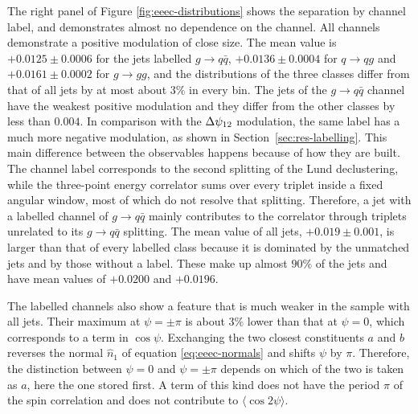 The right panel of Figure \ref{fig:eeec-distributions} shows the separation by channel label,
and demonstrates almost no dependence on the channel. All channels demonstrate a positive 
modulation of close size. The mean value is $+0.0125 \pm 0.0006$ for the
jets labelled $g \to q\bar{q}$, $+0.0136 \pm 0.0004$ for $q \to qg$ and
$+0.0161 \pm 0.0002$ for $g \to gg$, and the distributions of the three classes
differ from that of all jets by at most about $3\%$ in every bin. The jets of
the $g \to q\bar{q}$ channel have the weakest positive modulation and 
they differ from the other classes by less than $0.004$. In comparison with the
$\Delta\psi_{12}$ modulation, the same label has a much more negative modulation, as shown in Section~\ref{sec:res-labelling}.
This main difference between the observables happens because of how they are built. The channel
label corresponds to the second splitting of the Lund declustering, while the three-point energy
correlator sums over every triplet inside a fixed angular window, most of which do not
resolve that splitting. Therefore, a jet with a labelled channel of $g \to q\bar{q}$
mainly contributes to the correlator through triplets unrelated to its $g \to q\bar{q}$ splitting.
The mean value of all jets, $+0.019 \pm 0.001$, is larger than that of
every labelled class because it is dominated by the unmatched jets and by those
without a label. These make up almost $90\%$ of the jets and have mean values of
$+0.0200$ and $+0.0196$.

The labelled channels also show a feature that is much weaker in the sample with all jets. 
Their maximum at $\psi = \pm\pi$ is about $3\%$ lower than that at
$\psi = 0$, which corresponds to a term in $\cos\psi$. Exchanging the two closest
constituents $a$ and $b$ reverses the normal $\hat{n}_1$ of
equation \eqref{eq:eeec-normals} and shifts $\psi$ by $\pi$. Therefore, the distinction between
$\psi = 0$ and $\psi = \pm\pi$ depends on which of the two is taken as
$a$, here the one stored first. A term of this kind does not have the period $\pi$
of the spin correlation and does not contribute to $\langle \cos 2\psi \rangle$.


